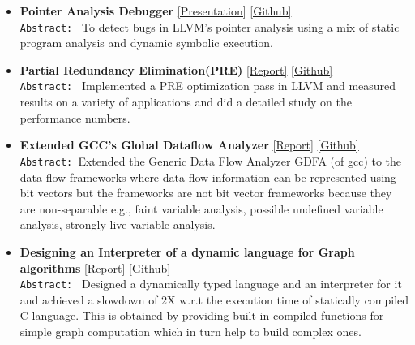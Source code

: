 \documentclass[9pt]{article}
\newenvironment{changemargin}[2]{%
  \begin{list}{}{%
    \setlength{\topsep}{0pt}%
    \setlength{\leftmargin}{#1}%
    \setlength{\rightmargin}{#2}%
    \setlength{\listparindent}{\parindent}%
    \setlength{\itemindent}{\parindent}%
    \setlength{\parsep}{\parskip}%
  }%
  \item[]}{\end{list}
}
\newenvironment{body} {
	\vspace*{-16pt}
	\begin{changemargin}{-0.25in}{-0.5in}
  }	
	{\end{changemargin}
}
\begin{document}
\begin{body}
\begin{itemize}
           \item \textbf{Pointer Analysis Debugger} 
             \href{https://www.dropbox.com/s/pm47zniafdydotw/pa_debugger.pdf?dl=0}{[Presentation]} 
           \href{https://github.com/sdasgup3/symbolic-analysis}{[Github]} \\
                                  \texttt{Abstract: } To detect bugs in LLVM's
                                  pointer analysis using a mix of static
                                  program analysis and dynamic symbolic
                                  execution. 

           \item \textbf{Partial Redundancy Elimination(PRE)} 
           \href{http://webhost.engr.illinois.edu/~sdasgup3/Document/report_cs526.pdf}{[Report]} 
           \href{https://github.com/sdasgup3/partial-redundancy-elimination}{[Github]} \\
                                  \texttt{Abstract: } Implemented a PRE
                                  optimization pass in LLVM and measured results
                                  on a variety of applications and did a detailed 
                                  study on the performance numbers. 

            \item \textbf{Extended GCC's Global Dataflow Analyzer} 
           \href{http://webhost.engr.illinois.edu/~sdasgup3/Document/report_gdfa.pdf}{[Report]} 
           \href{https://github.com/sdasgup3/non-separable-global-dataflow-framework}{[Github]} \\
                                \texttt{Abstract: }Extended the Generic Data Flow Analyzer
                                GDFA (of gcc) to the data flow frameworks where
                                data flow information can be represented using
                                bit vectors but the frameworks are not bit
                                vector frameworks because they are
                                non-separable e.g., faint variable analysis,
                                possible undefined variable analysis, strongly
                                live variable analysis.	

           \item \textbf{Designing an Interpreter of a dynamic language for Graph
algorithms}
           \href{http://webhost.engr.illinois.edu/~sdasgup3/Document/report_cs598dhp.pdf}{[Report]} 
           \href{https://github.com/sdasgup3/gri}{[Github]} \\
                                  \texttt{Abstract: } 
                                  Designed a dynamically typed language and an interpreter for it and 
                                  achieved a slowdown of 2X w.r.t the execution time of statically compiled C
                                  language. This is obtained by providing built-in compiled functions 
                                  for simple graph computation which in turn help to build complex
                                  ones.


\end{itemize}
\end{body}
\end{document}

